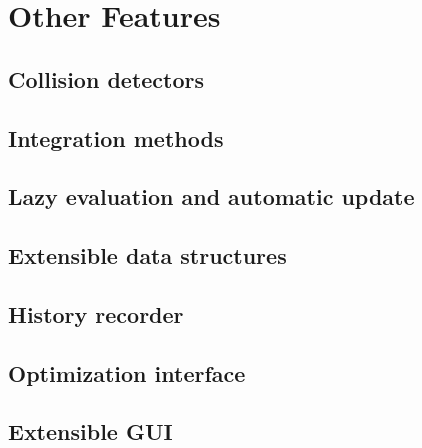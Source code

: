 \section{Other Features}
\subsection{Collision detectors}
\subsection{Integration methods}
\subsection{Lazy evaluation and automatic update}
\subsection{Extensible data structures}
\subsection{History recorder}
\subsection{Optimization interface}
\subsection{Extensible GUI}
